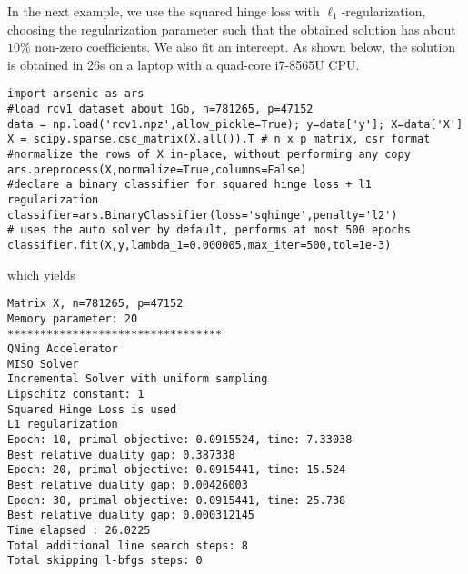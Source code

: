 \documentclass{article}
\begin{document}
In the next example, we use the squared hinge loss with
$\ell_1$-regularization, choosing the regularization parameter such that the
obtained solution has about $10\%$ non-zero coefficients.
We also fit an intercept. As shown below, the solution is obtained in 26s on a
laptop with a quad-core i7-8565U CPU.
\begin{verbatim}
import arsenic as ars
#load rcv1 dataset about 1Gb, n=781265, p=47152
data = np.load('rcv1.npz',allow_pickle=True); y=data['y']; X=data['X']
X = scipy.sparse.csc_matrix(X.all()).T # n x p matrix, csr format 
#normalize the rows of X in-place, without performing any copy
ars.preprocess(X,normalize=True,columns=False) 
#declare a binary classifier for squared hinge loss + l1 regularization
classifier=ars.BinaryClassifier(loss='sqhinge',penalty='l2')
# uses the auto solver by default, performs at most 500 epochs
classifier.fit(X,y,lambda_1=0.000005,max_iter=500,tol=1e-3) 
\end{verbatim}
which yields
\begin{verbatim}
Matrix X, n=781265, p=47152
Memory parameter: 20
*********************************
QNing Accelerator
MISO Solver
Incremental Solver with uniform sampling
Lipschitz constant: 1
Squared Hinge Loss is used
L1 regularization
Epoch: 10, primal objective: 0.0915524, time: 7.33038
Best relative duality gap: 0.387338
Epoch: 20, primal objective: 0.0915441, time: 15.524
Best relative duality gap: 0.00426003
Epoch: 30, primal objective: 0.0915441, time: 25.738
Best relative duality gap: 0.000312145
Time elapsed : 26.0225
Total additional line search steps: 8
Total skipping l-bfgs steps: 0
\end{verbatim}
\end{document}
